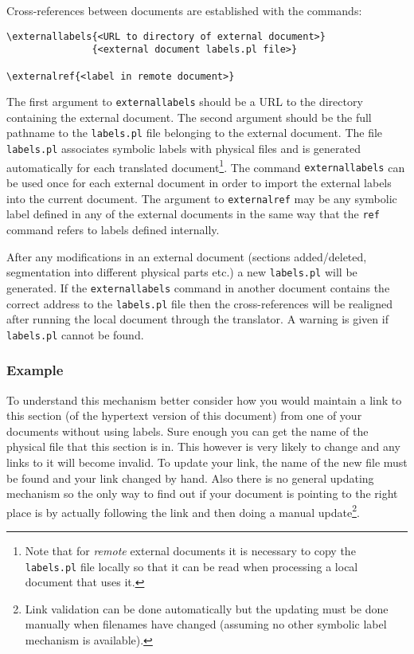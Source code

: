   
Cross-references between documents are established with the commands:
\begin{verbatim}
\externallabels{<URL to directory of external document>}
               {<external document labels.pl file>}

\externalref{<label in remote document>}
\end{verbatim}

The first argument to {\tt externallabels} should be a URL to 
the directory containing the external document.  
The second argument
should be the full pathname to the {\tt labels.pl} file belonging
to the external document. The file {\tt labels.pl} associates symbolic
labels with physical files and is generated automatically for each 
translated document\footnote{Note that for {\em remote} external
documents
it is necessary to copy the {\tt labels.pl} file locally so that it
can be read when processing a local document that uses it.}.
The command {\tt externallabels} can be used once for each external
document in order to import the external labels into the current document.
The argument to {\tt externalref} may be any symbolic label defined 
in any of the external documents in the same
way that the {\tt ref} command refers to  labels defined internally.


After any modifications in an external document (sections added/deleted,
segmentation into different physical parts etc.) a new {\tt labels.pl}
will be generated. If the {\tt externallabels} command in another 
document contains the correct address
to the {\tt labels.pl} file then the cross-references will be
realigned
after running the local document through the translator. A warning is
given
if {\tt labels.pl} cannot be found.
\subsubsection{Example}
\label{crossrefs} 
To understand this mechanism better consider 
how you would maintain a link to this section  
(of the hypertext version of this document) from one of your documents
without using labels.
Sure enough you can get the
name of the physical file that this section is in. This however is very
likely to change and any links to it will become invalid. To update 
your link, the name of the new file must be found and your link changed 
by hand. Also there is no general updating mechanism so the only way to
find
out if your document is pointing to the right place is by actually
following the link and then doing a manual update\footnote{
Link validation can be done automatically but the updating must be
done
manually when filenames have changed (assuming no other symbolic label
mechanism is available).}.

